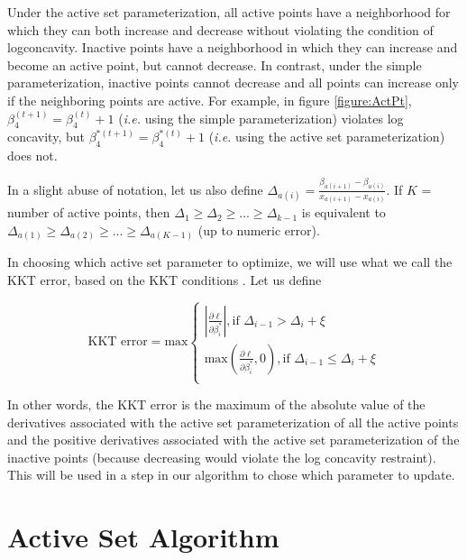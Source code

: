 	Under the active set parameterization, all active points have a neighborhood for which they can both increase and decrease without violating the condition of logconcavity. Inactive points have a neighborhood in which they can increase and become an active point, but cannot decrease. In contrast, under the simple parameterization, inactive points cannot decrease and all points can increase only if the neighboring points are active. For example, in figure \ref{figure:ActPt}, $\beta_4^{(t + 1)} = \beta_4^{(t)} + 1$ (\emph{i.e.} using the simple parameterization) violates log concavity, but $\beta_4^{*(t+1)} = \beta_4^{*(t)} + 1$ (\emph{i.e.} using the active set parameterization) does not. 
	
	In a slight abuse of notation, let us also define $\Delta_{a(i)} = \frac{\beta_{a(i + 1)} - \beta_{a(i)} } {x_{a(i + 1)} - x_{a(i)} }$. If $K$ = number of active points, then $\Delta_1 \geq \Delta_2 \geq ... \geq \Delta_{k-1}$ is equivalent to $\Delta_{a(1)} \geq \Delta_{a(2)} \geq ... \geq \Delta_{a(K-1)}$ (up to numeric error). 

	In choosing which active set parameter to optimize, we will use what we call the KKT error, based on the KKT conditions \cite{RefKKT1951}. Let us define
	
	\[
	\textrm{KKT error} = {\textrm{max}} 
	\begin{cases}
		|\frac{\partial \ell } {\partial \beta_i^*}|,  \textrm{if } \Delta_{i-1} > \Delta_{i} + \xi \\
		\textrm{max}(\frac{\partial \ell}{\partial \beta_i^*},0 ) ,  \textrm{if } \Delta_{i-1} \leq \Delta_i + \xi \\  
	\end{cases}
	\]
	
	In other words, the KKT error is the maximum of the absolute value of the derivatives associated with the active set parameterization of all the active points and the positive derivatives associated with the active set parameterization of the inactive points (because decreasing would violate the log concavity restraint). This will be used in a step in our algorithm to chose which parameter to update. 
\\



{\section{Active Set Algorithm} 
\label{sec:asa}	}

